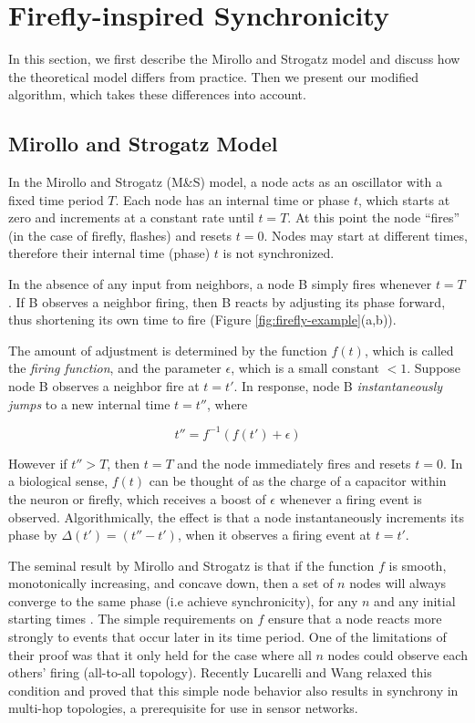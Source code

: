 \section{Firefly-inspired Synchronicity}
\label{sec-algorithm}

In this section, we first describe the Mirollo and Strogatz model and
discuss how the theoretical model differs from practice. Then we
present our modified algorithm, which takes these differences into
account.

\subsection{Mirollo and Strogatz Model}
\label{sec:strogatz}

In the Mirollo and Strogatz (M\&S) model, a node acts as an oscillator
with a fixed time period $T$. Each node has an internal time or phase
$t$, which starts at zero and increments at a constant rate until
$t=T$. At this point the node ``fires'' (in the case of firefly,
flashes) and resets $t=0$. Nodes may start at different times,
therefore their internal time (phase) $t$ is not synchronized.

In the absence of any input from neighbors, a node B simply fires
whenever $t=T$. If B observes a neighbor firing, then B reacts by
adjusting its phase forward, thus shortening its own time to fire
(Figure \ref{fig:firefly-example}(a,b)).

The amount of adjustment is determined by the function $f(t)$, which
is called the {\em firing function}, and the parameter $\epsilon$,
which is a small constant $< 1$. Suppose node B observes a neighbor
fire at $t=t'$. In response, node B {\em instantaneously jumps} to a
new internal time $t = t''$, where

\begin{equation}
\label{eqn:strogatz}
t'' = f^{-1}(f(t') + \epsilon)
\end{equation}

However if $t'' > T$, then $t = T$ and the node immediately fires and
resets $t=0$. In a biological sense, $f(t)$ can be thought of as the
charge of a capacitor within the neuron or firefly, which receives a
boost of $\epsilon$ whenever a firing event is
observed. Algorithmically, the effect is that a node instantaneously
increments its phase by $\Delta(t') = (t'' - t')$, when it observes a
firing event at $t=t'$.

The seminal result by Mirollo and Strogatz is that if the function $f$
is smooth, monotonically increasing, and concave down, then a set of
$n$ nodes will always converge to the same phase (i.e achieve
synchronicity), for any $n$ and any initial starting times
\cite{strogatz}. The simple requirements on $f$ ensure that a node
reacts more strongly to events that occur later in its time
period. One of the limitations of their proof was that it only held
for the case where all $n$ nodes could observe each others' firing
(all-to-all topology). Recently Lucarelli and Wang \cite{lucarelli04}
relaxed this condition and proved that this simple node behavior also
results in synchrony in multi-hop topologies, a prerequisite for use
in sensor networks.

